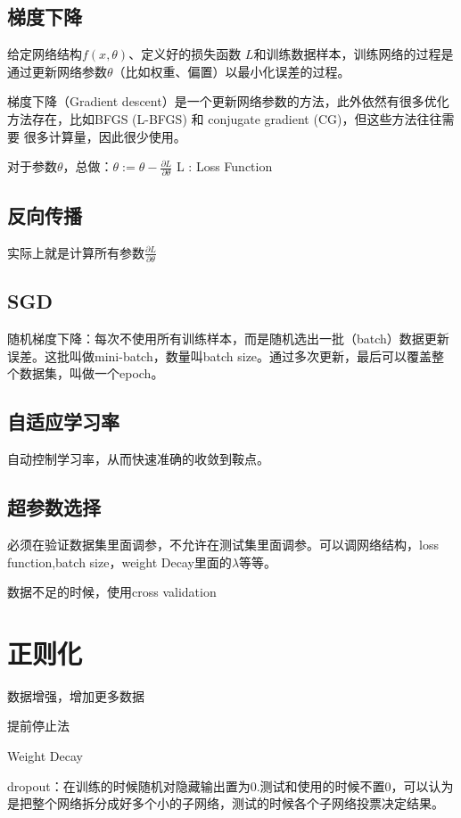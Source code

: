 \documentclass[UTF8]{ctexart}
\begin{document}
\subsection{梯度下降}
给定网络结构$f(x,\theta)$、定义好的损失函数 $L$和训练数据样本，训练网络的过程是
通过更新网络参数$\theta$（比如权重、偏置）以最小化误差的过程。

梯度下降（Gradient descent）是一个更新网络参数的方法，此外依然有很多优化
方法存在，比如BFGS (L-BFGS) 和 conjugate gradient (CG)，但这些方法往往需要
很多计算量，因此很少使用。

对于参数$\theta$，总做：$\theta:=\theta - \frac{\partial L}{\partial \theta}$ L : Loss Function

\subsection{反向传播}
实际上就是计算所有参数$\frac{\partial L}{\partial \theta}$

\subsection{SGD}
随机梯度下降：每次不使用所有训练样本，而是随机选出一批（batch）数据更新误差。这批叫做mini-batch，数量叫batch size。通过多次更新，最后可以覆盖整个数据集，叫做一个epoch。

\subsection{自适应学习率}
自动控制学习率，从而快速准确的收敛到鞍点。

\subsection{超参数选择}
必须在验证数据集里面调参，不允许在测试集里面调参。可以调网络结构，loss function,batch size，weight Decay里面的$\lambda$等等。

数据不足的时候，使用cross validation

\section{正则化}
数据增强，增加更多数据

提前停止法

Weight Decay

dropout：在训练的时候随机对隐藏输出置为0.测试和使用的时候不置0，可以认为是把整个网络拆分成好多个小的子网络，测试的时候各个子网络投票决定结果。
\end{document}
